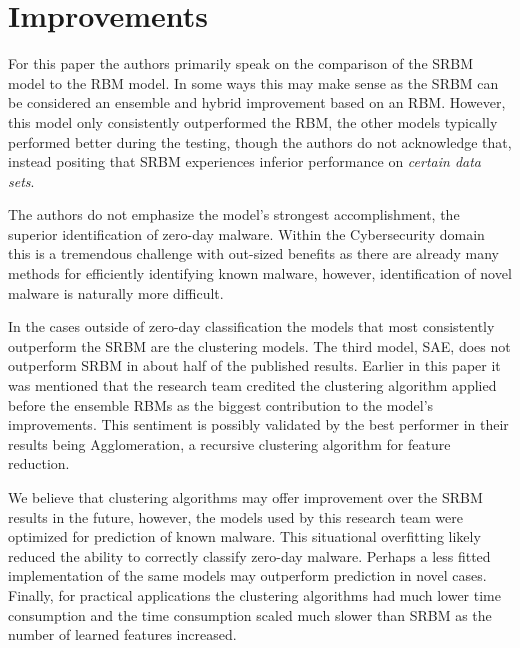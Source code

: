 \documentclass[]{article}
\begin{document}
\section{Improvements}

For this paper the authors primarily speak on the comparison of the SRBM model to the RBM model.
In some ways this may make sense as the SRBM can be considered an ensemble and hybrid improvement based on an RBM.
However, this model only consistently outperformed the RBM, the other models typically performed better during the testing, though the authors do not acknowledge that, instead positing that SRBM experiences inferior performance on \emph{certain data sets}.

The authors do not emphasize the model's strongest accomplishment, the superior identification of zero-day malware. 
Within the Cybersecurity domain this is a tremendous challenge with out-sized benefits as there are already many methods for efficiently identifying known malware, however, identification of novel malware is naturally more difficult.

In the cases outside of zero-day classification the models that most consistently outperform the SRBM are the clustering models.
The third model, SAE, does not outperform SRBM in about half of the published results.
Earlier in this paper it was mentioned that the research team credited the clustering algorithm applied before the ensemble RBMs as the biggest contribution to the model's improvements.
This sentiment is possibly validated by the best performer in their results being Agglomeration, a recursive clustering algorithm for feature reduction.

We believe that clustering algorithms may offer improvement over the SRBM results in the future, however, the models used by this research team were optimized for prediction of known malware.
This situational overfitting likely reduced the ability to correctly  classify zero-day malware.
Perhaps a less fitted implementation of the same models may outperform prediction in novel cases.
Finally, for practical applications the clustering algorithms had much lower time consumption and the time consumption scaled much slower than SRBM as the number of learned features increased.

\clearpage


\end{document}
